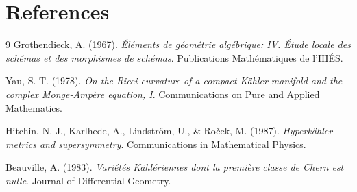 \documentclass[11pt,oneside]{article}
\begin{document}
\section{References}
\begin{thebibliography}{9}
Grothendieck, A. (1967). \textit{Éléments de géométrie algébrique: IV. Étude locale des schémas et des morphismes de schémas}. Publications Mathématiques de l'IHÉS.

Yau, S. T. (1978). \textit{On the Ricci curvature of a compact K\"ahler manifold and the complex Monge-Amp\`ere equation, I}. Communications on Pure and Applied Mathematics.

Hitchin, N. J., Karlhede, A., Lindstr\"om, U., \& Ro\v{c}ek, M. (1987). \textit{Hyperk\"ahler metrics and supersymmetry}. Communications in Mathematical Physics.

Beauville, A. (1983). \textit{Variétés Kählériennes dont la première classe de Chern est nulle}. Journal of Differential Geometry.
\end{thebibliography}
\end{document}
